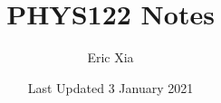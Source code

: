 \documentclass{article}
\title{PHYS122 Notes}
\author{Eric Xia}
\date{Last Updated 3 January 2021}
\begin{document}
    \maketitle
    \tableofcontents
    \pagebreak

\end{document}

